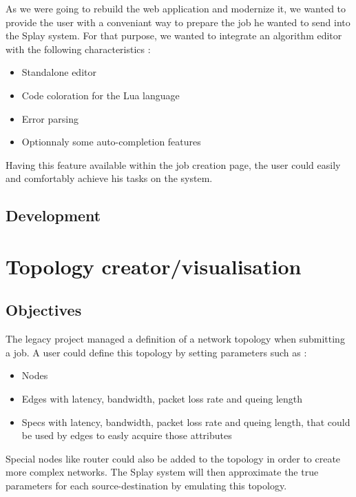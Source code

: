 \documentclass{eplmastersthesis}
\begin{document}
        As we were going to rebuild the web application and modernize it,
        we wanted to provide the user with a conveniant way to prepare
        the job he wanted to send into the Splay system. For that purpose,
        we wanted to integrate an algorithm editor with the following
        characteristics :

        \begin{itemize}
          \item Standalone editor
          \item Code coloration for the Lua language
          \item Error parsing
          \item Optionnaly some auto-completion features
        \end{itemize}

        Having this feature available within the job creation page, the user
        could easily and comfortably achieve his tasks on the system.
      \subsection{Development}

    \section{Topology creator/visualisation}
      \subsection{Objectives}
        The legacy project managed a definition of a network topology when
        submitting a job. A user could define this topology by setting
        parameters such as :

        \begin{itemize}
          \item Nodes
          \item Edges with latency, bandwidth, packet loss rate and queing
          length
          \item Specs with latency, bandwidth, packet loss rate and queing
          length, that could be used by edges to easly acquire those
          attributes
        \end{itemize}

        Special nodes like router could also be added to the topology in order
        to create more complex networks. The Splay system will then
        approximate the true parameters for each source-destination by
        emulating this topology.\\
\end{document}
